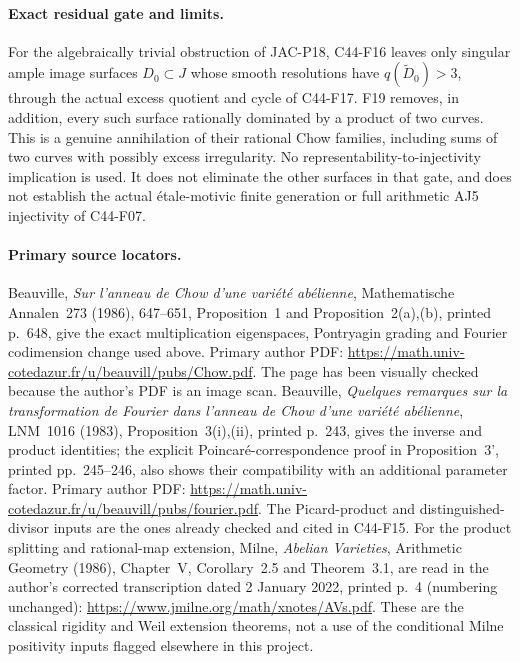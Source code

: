 \documentclass[11pt]{article}
\theoremstyle{remark}\newtheorem{remark}[theorem]{Remark}
\begin{document}
\paragraph{Exact residual gate and limits.}
For the algebraically trivial obstruction of JAC-P18,
C44-F16 leaves only singular ample image surfaces
$D_0\subset J$ whose smooth resolutions have
$q(\widetilde D_0)>3$, through the actual excess quotient
and cycle of C44-F17.  F19 removes, in addition, every
such surface rationally dominated by a product of two
curves.  This is a genuine
annihilation of their rational Chow families, including
sums of two curves with possibly excess irregularity.
No representability-to-injectivity implication is used.
It does not eliminate the other surfaces in that gate,
and does not establish the actual \'etale-motivic
finite generation or full arithmetic AJ5 injectivity
of C44-F07.

\paragraph{Primary source locators.}
Beauville, \emph{Sur l'anneau de Chow d'une vari\'et\'e
ab\'elienne}, Mathematische Annalen~273 (1986), 647--651,
Proposition~1 and Proposition~2(a),(b), printed p.~648,
give the exact multiplication eigenspaces, Pontryagin
grading and Fourier codimension change used above.
Primary author PDF:
\url{https://math.univ-cotedazur.fr/u/beauvill/pubs/Chow.pdf}.
The page has been visually checked because the author's
PDF is an image scan.
Beauville, \emph{Quelques remarques sur la transformation
de Fourier dans l'anneau de Chow d'une vari\'et\'e
ab\'elienne}, LNM~1016 (1983), Proposition~3(i),(ii),
printed p.~243, gives the inverse and product identities;
the explicit Poincar\'e-correspondence proof in
Proposition~3', printed pp.~245--246, also shows their
compatibility with an additional parameter factor.
Primary author PDF:
\url{https://math.univ-cotedazur.fr/u/beauvill/pubs/fourier.pdf}.
The Picard-product and distinguished-divisor inputs are
the ones already checked and cited in C44-F15.
For the product splitting and rational-map extension,
Milne, \emph{Abelian Varieties}, Arithmetic Geometry
(1986), Chapter~V, Corollary~2.5 and Theorem~3.1,
are read in the author's corrected transcription dated
2 January 2022, printed p.~4 (numbering unchanged):
\url{https://www.jmilne.org/math/xnotes/AVs.pdf}.
These are the classical rigidity and Weil extension
theorems, not a use of the conditional Milne positivity
inputs flagged elsewhere in this project.
\end{document}

